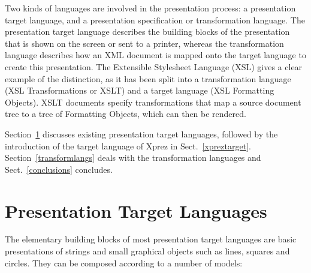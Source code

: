 Two kinds of languages are involved in the presentation process: a presentation target language, and a presentation specification or transformation language. The presentation target language describes the building blocks of the presentation that is shown on the screen or sent to a printer, whereas the transformation language describes how an XML document is mapped onto the target language to create this presentation. The Extensible Stylesheet Language (XSL) gives a clear example of the distinction, as it has been split into a transformation language (XSL Transformations or XSLT) and a target language (XSL Formatting Objects). XSLT documents specify transformations that map a source document tree to a tree of Formatting Objects, which can then be rendered. 

Section~\ref{targetlangs} discusses existing presentation target languages, followed by the introduction of the target language of {\sc Xprez} in Sect.~\ref{xpreztarget}. Section~\ref{transformlangs} deals with the transformation languages and Sect.~\ref{conclusions} concludes.


%																
%																
%																
\section{Presentation Target Languages}
\label{targetlangs}

The elementary building blocks of most presentation target languages are basic presentations of strings and small graphical objects such as lines, squares and circles. They can be composed according to a number of models:


